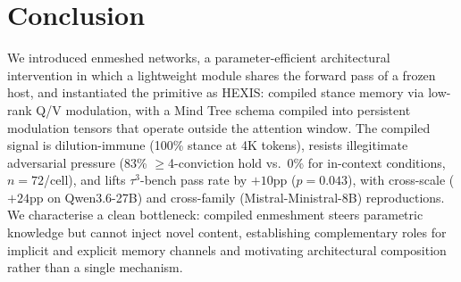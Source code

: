 \section{Conclusion}
\label{sec:conclusion}

We introduced enmeshed networks, a parameter-efficient architectural intervention in which a lightweight module shares the forward pass of a frozen host, and instantiated the primitive as HEXIS: compiled stance memory via low-rank Q/V modulation, with a Mind Tree schema compiled into persistent modulation tensors that operate outside the attention window. The compiled signal is dilution-immune (100\% stance at 4K tokens), resists illegitimate adversarial pressure (83\% $\geq$4-conviction hold vs.\ 0\% for in-context conditions, $n=72$/cell), and lifts $\tau^3$-bench pass rate by $+10$pp ($p=0.043$), with cross-scale ($+24$pp on Qwen3.6-27B) and cross-family (Mistral-Ministral-8B) reproductions. We characterise a clean bottleneck: compiled enmeshment steers parametric knowledge but cannot inject novel content, establishing complementary roles for implicit and explicit memory channels and motivating architectural composition rather than a single mechanism.
